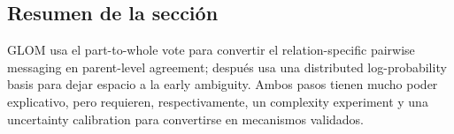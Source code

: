 
\subsection{Resumen de la sección}

GLOM usa el part-to-whole vote para convertir el relation-specific pairwise messaging en parent-level agreement; después usa una distributed log-probability basis para dejar espacio a la early ambiguity. Ambos pasos tienen mucho poder explicativo, pero requieren, respectivamente, un complexity experiment y una uncertainty calibration para convertirse en mecanismos validados.
